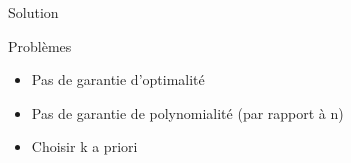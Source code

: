 \documentclass[11pt]{beamer}
\newcommand{\Pythonsmall}[1]{
	{\scriptsize }
}
\begin{document}
\begin{frame}{Solution}
\Pythonsmall{ex501bis}
\end{frame}


\begin{frame}{Problèmes}

\begin{itemize}
	\item Pas de garantie d'optimalité
	\item Pas de garantie de polynomialité (par rapport à n)
	\item Choisir k a priori
\end{itemize}

\end{frame}

\end{document}
